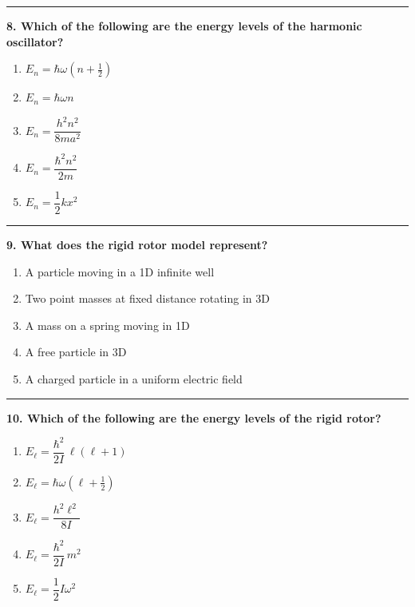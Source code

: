 \documentclass[
  english,
  9pt,
]{extbook}
\providecommand{\tightlist}{%
  \setlength{\itemsep}{0pt}\setlength{\parskip}{0pt}}
\theoremstyle{definition}
\theoremstyle{definition}
\theoremstyle{definition}
\theoremstyle{definition}
\theoremstyle{remark}
\begin{document}
\begin{center}\rule{0.5\linewidth}{0.5pt}\end{center}

\textbf{8. Which of the following are the energy levels of the harmonic oscillator?}

\begin{enumerate}
\def\labelenumi{\alph{enumi}.}
\tightlist
\item
  \(E_n = \hbar \omega \left(n + \tfrac{1}{2}\right)\)\\
\item
  \(E_n = \hbar \omega n\)\\
\item
  \(E_n = \dfrac{h^2 n^2}{8 m a^2}\)\\
\item
  \(E_n = \dfrac{\hbar^2 n^2}{2m}\)\\
\item
  \(E_n = \dfrac{1}{2} k x^2\)
\end{enumerate}

\begin{center}\rule{0.5\linewidth}{0.5pt}\end{center}

\textbf{9. What does the rigid rotor model represent?}

\begin{enumerate}
\def\labelenumi{\alph{enumi}.}
\tightlist
\item
  A particle moving in a 1D infinite well\\
\item
  Two point masses at fixed distance rotating in 3D\\
\item
  A mass on a spring moving in 1D\\
\item
  A free particle in 3D\\
\item
  A charged particle in a uniform electric field
\end{enumerate}

\begin{center}\rule{0.5\linewidth}{0.5pt}\end{center}

\textbf{10. Which of the following are the energy levels of the rigid rotor?}

\begin{enumerate}
\def\labelenumi{\alph{enumi}.}
\tightlist
\item
  \(E_\ell = \dfrac{\hbar^2}{2I}\,\ell(\ell+1)\)\\
\item
  \(E_\ell = \hbar \omega (\ell + \tfrac{1}{2})\)\\
\item
  \(E_\ell = \dfrac{h^2 \ell^2}{8 I}\)\\
\item
  \(E_\ell = \dfrac{\hbar^2}{2I}\,m^2\)\\
\item
  \(E_\ell = \dfrac{1}{2} I \omega^2\)
\end{enumerate}
\end{document}
